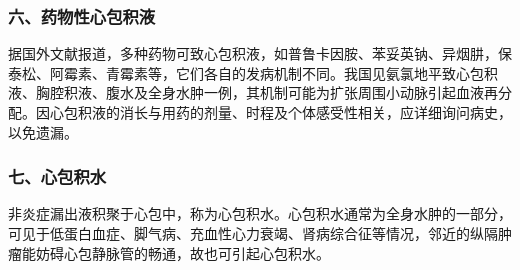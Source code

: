 \subsubsection{六、药物性心包积液}

据国外文献报道，多种药物可致心包积液，如普鲁卡因胺、苯妥英钠、异烟肼，保泰松、阿霉素、青霉素等，它们各自的发病机制不同。我国见氨氯地平致心包积液、胸腔积液、腹水及全身水肿一例，其机制可能为扩张周围小动脉引起血液再分配。因心包积液的消长与用药的剂量、时程及个体感受性相关，应详细询问病史，以免遗漏。

\subsubsection{七、心包积水}

非炎症漏出液积聚于心包中，称为心包积水。心包积水通常为全身水肿的一部分，可见于低蛋白血症、脚气病、充血性心力衰竭、肾病综合征等情况，邻近的纵隔肿瘤能妨碍心包静脉管的畅通，故也可引起心包积水。

